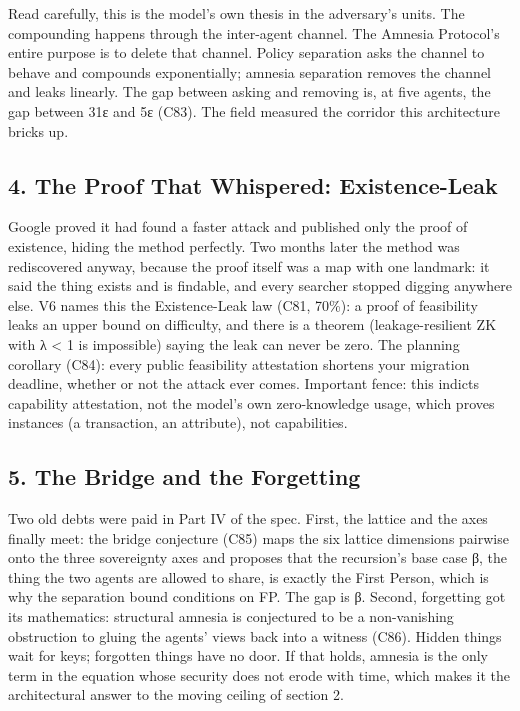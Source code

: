 \documentclass[
  11pt,
]{article}
\begin{document}
Read carefully, this is the model's own thesis in the adversary's units.
The compounding happens through the inter-agent channel. The Amnesia
Protocol's entire purpose is to delete that channel. Policy separation
asks the channel to behave and compounds exponentially; amnesia
separation removes the channel and leaks linearly. The gap between
asking and removing is, at five agents, the gap between 31ε and 5ε
(C83). The field measured the corridor this architecture bricks up.

\subsection{4. The Proof That Whispered:
Existence-Leak}\label{the-proof-that-whispered-existence-leak}

Google proved it had found a faster attack and published only the proof
of existence, hiding the method perfectly. Two months later the method
was rediscovered anyway, because the proof itself was a map with one
landmark: it said the thing exists and is findable, and every searcher
stopped digging anywhere else. V6 names this the Existence-Leak law
(C81, 70\%): a proof of feasibility leaks an upper bound on difficulty,
and there is a theorem (leakage-resilient ZK with λ \textless{} 1 is
impossible) saying the leak can never be zero. The planning corollary
(C84): every public feasibility attestation shortens your migration
deadline, whether or not the attack ever comes. Important fence: this
indicts capability attestation, not the model's own zero-knowledge
usage, which proves instances (a transaction, an attribute), not
capabilities.

\subsection{5. The Bridge and the
Forgetting}\label{the-bridge-and-the-forgetting}

Two old debts were paid in Part IV of the spec. First, the lattice and
the axes finally meet: the bridge conjecture (C85) maps the six lattice
dimensions pairwise onto the three sovereignty axes and proposes that
the recursion's base case β, the thing the two agents are allowed to
share, is exactly the First Person, which is why the separation bound
conditions on FP. The gap is β. Second, forgetting got its mathematics:
structural amnesia is conjectured to be a non-vanishing obstruction to
gluing the agents' views back into a witness (C86). Hidden things wait
for keys; forgotten things have no door. If that holds, amnesia is the
only term in the equation whose security does not erode with time, which
makes it the architectural answer to the moving ceiling of section 2.
\end{document}
